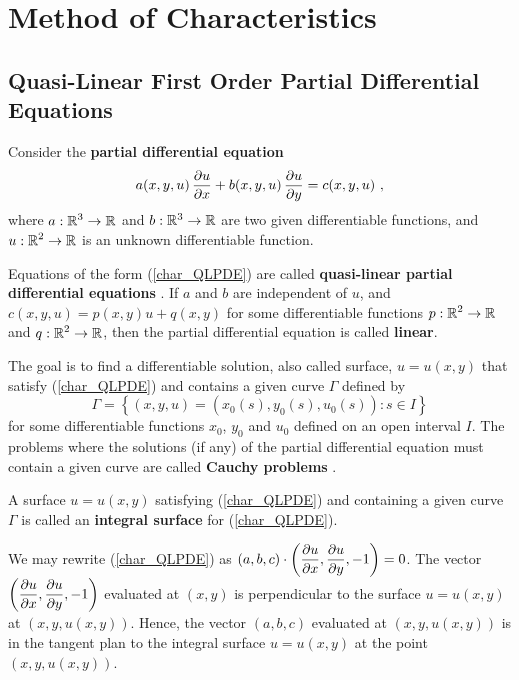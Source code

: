 \chapter{Method of Characteristics}\label{ChapCaract}

\section[Quasi-Linear First Order Equations]{Quasi-Linear First Order
Partial Differential Equations}

Consider the {\bfseries partial differential equation}
\begin{equation}\label{char_QLPDE}
a(x,y,u)\,\frac{\partial{u}}{\partial x} + b(x,y,u)\,\frac{\partial{u}}{\partial y} = c(x,y,u) \ ,
\end{equation}
where $\displaystyle a:\mathbb{R}^3\rightarrow \mathbb{R}$ and $b:\mathbb{R}^3\rightarrow \mathbb{R}$ are
two given differentiable functions, and
$\displaystyle u:\mathbb{R}^2\rightarrow \mathbb{R}$ is an
unknown differentiable function.

Equations of the form (\ref{char_QLPDE}) are called
{\bfseries quasi-linear partial differential equations}%
.
If $a$ and $b$ are independent of $u$, and
$c(x,y,u) = p(x,y) u + q(x,y)$ for some differentiable functions
$\displaystyle p:\mathbb{R}^2\rightarrow \mathbb{R}$ and
$\displaystyle q:\mathbb{R}^2\rightarrow \mathbb{R}$, then the
partial differential equation is called
{\bfseries linear}.

The goal is to find a differentiable solution, also called surface,
$u=u(x,y)$ that satisfy (\ref{char_QLPDE}) and contains a given curve
$\Gamma$ defined by
\[
\Gamma = \left\{ (x,y,u) = \left(x_0(s), y_0(s),u_0(s)\right) : s\in I \right\}
\]
for some differentiable functions $x_0$, $y_0$ and $u_0$ defined on 
an open interval $I$.  The problems where the
solutions (if any) of the partial differential equation must contain a
given curve are called
{\bfseries Cauchy problems}%
.

\begin{defn}
A surface $u=u(x,y)$ satisfying (\ref{char_QLPDE}) and containing a
given curve $\Gamma$ is called an
{\bfseries integral surface}%
 for
(\ref{char_QLPDE}).
\end{defn}

We may rewrite (\ref{char_QLPDE}) as
$\displaystyle (a,b,c) \cdot \left(\frac{\partial{u}}{\partial x}, \frac{\partial{u}}{\partial y}, -1 \right) = 0$.
The vector $\displaystyle \left(\frac{\partial{u}}{\partial x}, \frac{\partial{u}}{\partial y}, -1 \right)$
evaluated at $(x,y)$ is perpendicular to the surface $u=u(x,y)$ at
$\displaystyle \left(x,y,u(x,y)\right)$.  Hence, the vector
$(a,b,c)$ evaluated at $(x,y,u(x,y))$ is in the tangent plan to the integral
surface $u=u(x,y)$ at the point $\displaystyle \left(x,y,u(x,y)\right)$.

